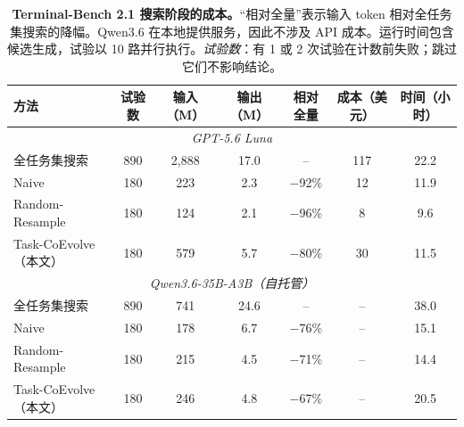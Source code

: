 \begin{table}[t]
\centering
\caption{\textbf{Terminal-Bench 2.1 搜索阶段的成本。}``相对全量''表示输入 token 相对全任务集搜索的降幅。Qwen3.6 在本地提供服务，因此不涉及 API 成本。运行时间包含候选生成，试验以 10 路并行执行。\emph{试验数}：有 1 或 2 次试验在计数前失败；跳过它们不影响结论。}
\label{table:tb2_cost}
\small
\setlength{\tabcolsep}{5pt}
\begin{tabular}{lcccccc}
\toprule
方法 & 试验数 & 输入（M） & 输出（M） & 相对全量 & 成本（美元） & 时间（小时） \\
\midrule
\multicolumn{7}{c}{\textit{GPT-5.6 Luna}} \\
全任务集搜索 & 890 & 2{,}888 & 17.0 & -- & 117 & 22.2 \\
Naive & 180 & 223 & 2.3 & $-$92\% & 12 & 11.9 \\
Random-Resample & 180 & 124 & 2.1 & $-$96\% & 8 & 9.6 \\
Task-CoEvolve（本文） & 180 & 579 & 5.7 & $-$80\% & 30 & 11.5 \\
\midrule
\multicolumn{7}{c}{\textit{Qwen3.6-35B-A3B（自托管）}} \\
全任务集搜索 & 890 & 741 & 24.6 & -- & -- & 38.0 \\
Naive & 180 & 178 & 6.7 & $-$76\% & -- & 15.1 \\
Random-Resample & 180 & 215 & 4.5 & $-$71\% & -- & 14.4 \\
Task-CoEvolve（本文） & 180 & 246 & 4.8 & $-$67\% & -- & 20.5 \\
\bottomrule
\end{tabular}
\end{table}
